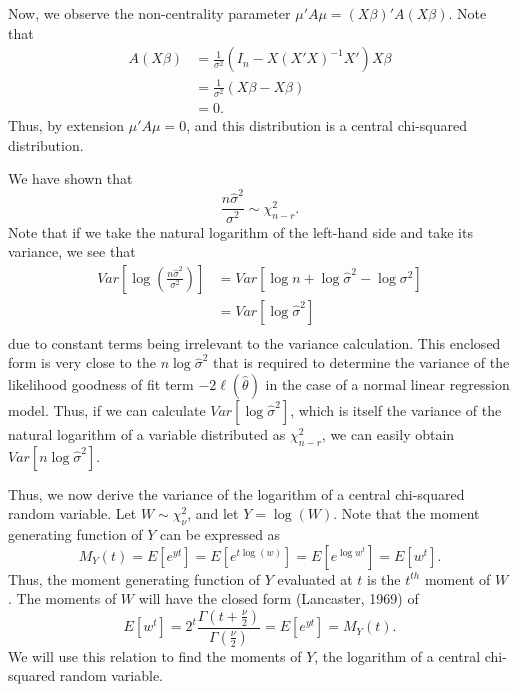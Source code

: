 Now, we observe the non-centrality parameter $\mu 'A \mu = (X \beta)'A(X \beta)$. Note that
\begin{equation*}
	\begin{split}
	A(X \beta) & = \frac{1}{\sigma^2} (I_n - X (X' X)^{-1} X')X\beta  \\ 
	& = \frac{1}{\sigma^2} (X \beta - X \beta) \\
	& = 0 .
	\end{split}
\end{equation*}
Thus, by extension $\mu 'A \mu = 0$, and this distribution is a central chi-squared distribution.

We have shown that
\begin{equation}
	\frac{n \hat{\sigma}^2}{\sigma^2} \sim \chi^2_{n-r} .
\end{equation}
Note that if we take the natural logarithm of the left-hand side and take its variance, we see that
\begin{equation}
	\begin{split}
		Var \left[ \log(\frac{n \hat{\sigma}^2}{\sigma^2}) \right] & = Var \left[ \log n + \log \hat{\sigma}^2 - \log \sigma^2 \right]  \\ 
		& = Var \left[ \log \hat{\sigma}^2 \right] \\
	\end{split}
\end{equation}
due to constant terms being irrelevant to the variance calculation. This enclosed form is very close to the $n \log \hat{\sigma}^2$ that is required
to determine the variance of the likelihood goodness of fit term $-2 \ell (\hat{\theta} )$ in the case of a normal linear regression model.
Thus, if we can calculate $Var \left[ \log \hat{\sigma}^2 \right]$, which is itself the variance
of the natural logarithm of a variable distributed as $\chi^2_{n-r}$, we can easily obtain $Var \left[ n \log \hat{\sigma}^2 \right]$.

Thus, we now derive the variance of the logarithm of a central chi-squared random variable. Let $W \sim \chi^2_{\nu}$, and let $Y = \log(W)$. Note that
the moment generating function of $Y$ can be expressed as
\begin{equation*}
	M_Y (t) = E \left[ e^{yt} \right] = E \left[ e^{t\log(w)} \right] = E \left[ e^{\log w^t} \right] = E \left[ w^t \right] .
\end{equation*}
Thus, the moment generating function of $Y$ evaluated at $t$ is the $t^{th}$ moment of $W$. The moments of $W$ will have the
closed form (Lancaster, 1969) of
\begin{equation*}
	E \left[ w^t \right] = 2^t \frac{\Gamma (t + \frac{\nu}{2})}{\Gamma (\frac{\nu}{2})} = E \left[ e^{yt} \right] = M_Y (t) .
\end{equation*}
We will use this relation to find the moments of $Y$, the logarithm of a central chi-squared random variable.

